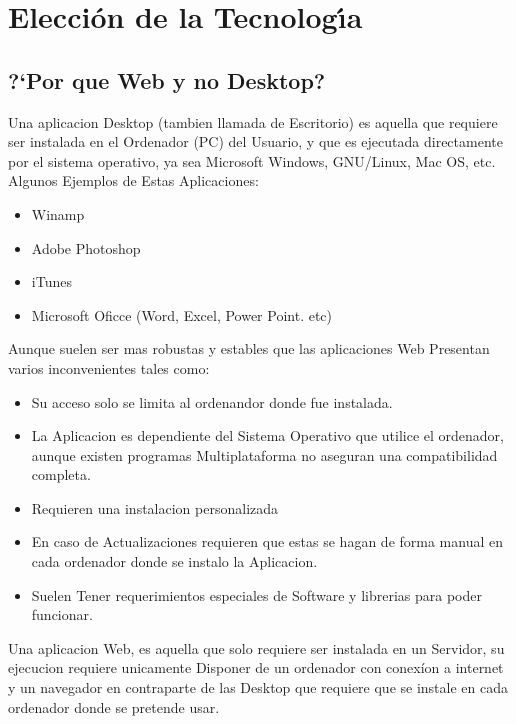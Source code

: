 \chapter{Elecci\'on de la Tecnolog\'{\i}a}

\section{?`Por que Web y no Desktop?}

Una aplicacion Desktop (tambien llamada de Escritorio) es aquella que requiere
ser instalada en el Ordenador (PC) del Usuario, y que es ejecutada directamente
por el sistema operativo, ya sea Microsoft Windows, GNU/Linux, Mac OS, etc.\\[0.1cm]

Algunos Ejemplos de Estas Aplicaciones:

\begin{itemize}
    \item Winamp
    \item Adobe Photoshop
    \item iTunes
    \item Microsoft Oficce (Word, Excel, Power Point. etc)
\end{itemize}

Aunque suelen ser mas robustas y estables que las aplicaciones Web Presentan
varios inconvenientes tales como:

\begin{itemize}
    \item Su acceso solo se limita al ordenandor donde fue instalada.
    \item La Aplicacion es dependiente del Sistema Operativo que utilice el ordenador, aunque
        existen programas Multiplataforma no aseguran una compatibilidad completa.
    \item Requieren una instalacion personalizada
    \item En caso de Actualizaciones requieren que estas se hagan de forma manual en cada ordenador
        donde se instalo la Aplicacion.
    \item Suelen Tener requerimientos especiales de Software y librerias para poder funcionar.
\end{itemize}


Una aplicacion Web, es aquella que solo requiere ser instalada en un Servidor, su 
ejecucion requiere unicamente Disponer de un ordenador con conexíon a internet
y un navegador en contraparte de las Desktop que requiere que se instale en cada 
ordenador donde se pretende usar.

